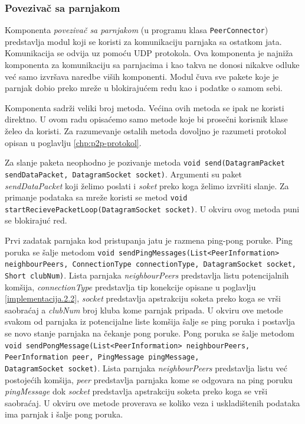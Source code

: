 \documentclass[12pt,oneside]{memoir}
\begin{document}
\subsubsection{Povezivač sa parnjakom}
\label{implementacija.2.3.2}

Komponenta \textit{povezivač sa parnjakom} (u programu klasa \texttt{PeerConnector}) predstavlja modul koji se koristi za komunikaciju parnjaka sa ostatkom jata. Komunikacija se odvija uz pomoću UDP protokola. Ova komponenta je najniža komponenta za komunikaciju sa parnjacima i kao takva ne donosi nikakve odluke već samo izvršava naredbe viših komponenti. Modul čuva sve pakete koje je parnjak dobio preko mreže u blokirajućem redu kao i podatke o samom sebi.

Komponenta sadrži veliki broj metoda. Većina ovih metoda se ipak ne koristi direktno. U ovom radu opisaćemo samo metode koje bi prosečni korisnik klase želeo da koristi. Za razumevanje ostalih metoda dovoljno je razumeti protokol opisan u poglavlju \ref{chp:p2p-protokol}. 

Za slanje paketa neophodno je pozivanje metoda \texttt{void send(DatagramPacket sendDataPacket, DatagramSocket socket)}. Argumenti su paket \textit{sendDataPacket} koji želimo poslati i \textit{soket} preko koga želimo izvršiti slanje. Za primanje podataka sa mreže koristi se metod \texttt{void startRecievePacketLoop(DatagramSocket socket)}. U okviru ovog metoda puni se blokirajuć red.

Prvi zadatak parnjaka kod pristupanja jatu je razmena ping-pong poruke. Ping poruka se šalje metodom \texttt{void sendPingMessages(List<PeerInformation> \\ neighbourPeers, ConnectionType connectionType, DatagramSocket socket, \\Short  clubNum)}. Lista parnjaka \textit{neighbourPeers} predstavlja listu potencijalnih komšija, \textit{connectionType} predstavlja tip konekcije opisane u poglavlju \ref{implementacija.2.2}, \textit{socket} predstavlja apstrakciju soketa preko koga se vrši saobraćaj a \textit{clubNum} broj kluba kome parnjak pripada. U okviru ove metode svakom od parnjaka iz potencijalne liste komšija šalje se ping poruka i postavlja se novo stanje parnjaka na čekanje pong poruke. Pong poruka se šalje metodom \texttt{void sendPongMessage(List<PeerInformation> neighbourPeers, PeerInformation peer, PingMessage pingMessage, \\DatagramSocket socket)}. Lista parnjaka \textit{neighbourPeers} predstavlja listu već postojećih komšija, \textit{peer} predstavlja parnjaka kome se odgovara na ping poruku \textit{pingMessage} dok \textit{socket} predstavlja apstrakciju soketa preko koga se vrši saobraćaj. U okviru ove metode proverava se koliko veza i uskladištenih podataka ima parnjak i šalje pong poruka. 
\end{document}
